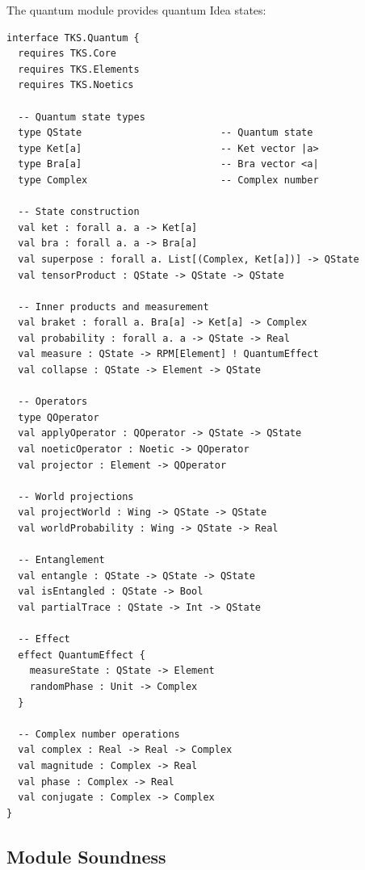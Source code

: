 \begin{definition}
\label{def:tks-quantum}
The quantum module provides quantum Idea states:
\begin{verbatim}
interface TKS.Quantum {
  requires TKS.Core
  requires TKS.Elements
  requires TKS.Noetics

  -- Quantum state types
  type QState                        -- Quantum state
  type Ket[a]                        -- Ket vector |a>
  type Bra[a]                        -- Bra vector <a|
  type Complex                       -- Complex number

  -- State construction
  val ket : forall a. a -> Ket[a]
  val bra : forall a. a -> Bra[a]
  val superpose : forall a. List[(Complex, Ket[a])] -> QState
  val tensorProduct : QState -> QState -> QState

  -- Inner products and measurement
  val braket : forall a. Bra[a] -> Ket[a] -> Complex
  val probability : forall a. a -> QState -> Real
  val measure : QState -> RPM[Element] ! QuantumEffect
  val collapse : QState -> Element -> QState

  -- Operators
  type QOperator
  val applyOperator : QOperator -> QState -> QState
  val noeticOperator : Noetic -> QOperator
  val projector : Element -> QOperator

  -- World projections
  val projectWorld : Wing -> QState -> QState
  val worldProbability : Wing -> QState -> Real

  -- Entanglement
  val entangle : QState -> QState -> QState
  val isEntangled : QState -> Bool
  val partialTrace : QState -> Int -> QState

  -- Effect
  effect QuantumEffect {
    measureState : QState -> Element
    randomPhase : Unit -> Complex
  }

  -- Complex number operations
  val complex : Real -> Real -> Complex
  val magnitude : Complex -> Real
  val phase : Complex -> Real
  val conjugate : Complex -> Complex
}
\end{verbatim}
\end{definition}

\subsection{Module Soundness}
\label{subsec:module-soundness}

